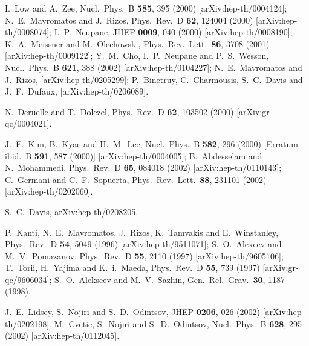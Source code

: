 \documentclass[a4paper,a4paper]{article}
\begin{document}
\begin{thebibliography}{99}
I.~Low and A.~Zee,
Nucl.\ Phys.\ B {\bf 585}, 395 (2000)
[arXiv:hep-th/0004124];
N.~E.~Mavromatos and J.~Rizos,
Phys.\ Rev.\ D {\bf 62}, 124004 (2000)
[arXiv:hep-th/0008074];
I.~P.~Neupane,
JHEP {\bf 0009}, 040 (2000)
[arXiv:hep-th/0008190];
K.~A.~Meissner and M.~Olechowski,
Phys.\ Rev.\ Lett.\  {\bf 86}, 3708 (2001)
[arXiv:hep-th/0009122];
Y.~M.~Cho, I.~P.~Neupane and P.~S.~Wesson,
Nucl.\ Phys.\ B {\bf 621}, 388 (2002)
[arXiv:hep-th/0104227];
N.~E.~Mavromatos and J.~Rizos,
[arXiv:hep-th/0205299];
P.~Binetruy, C.~Charmousis, S.~C.~Davis and J.~F.~Dufaux,
[arXiv:hep-th/0206089].


N.~Deruelle and T.~Dolezel,
Phys.\ Rev.\ D {\bf 62}, 103502 (2000)
[arXiv:gr-qc/0004021].


J.~E.~Kim, B.~Kyae and H.~M.~Lee,
Nucl.\ Phys.\ B {\bf 582}, 296 (2000)
[Erratum-ibid.\ B {\bf 591}, 587 (2000)]
[arXiv:hep-th/0004005];
B.~Abdesselam and N.~Mohammedi,
Phys.\ Rev.\ D {\bf 65}, 084018 (2002)
[arXiv:hep-th/0110143];
C.~Germani and C.~F.~Sopuerta,
Phys.\ Rev.\ Lett.\  {\bf 88}, 231101 (2002)
[arXiv:hep-th/0202060].



S.~C.~Davis,
arXiv:hep-th/0208205.



P.~Kanti, N.~E.~Mavromatos, J.~Rizos, K.~Tamvakis and E.~Winstanley,
Phys.\ Rev.\ D {\bf 54}, 5049 (1996)
[arXiv:hep-th/9511071];
S.~O.~Alexeev and M.~V.~Pomazanov,
Phys.\ Rev.\ D {\bf 55}, 2110 (1997)
[arXiv:hep-th/9605106];
T.~Torii, H.~Yajima and K.~i.~Maeda,
Phys.\ Rev.\ D {\bf 55}, 739 (1997)
[arXiv:gr-qc/9606034];
S.~O.~Alekseev and M.~V.~Sazhin,
Gen.\ Rel.\ Grav.\  {\bf 30}, 1187 (1998).


J.~E.~Lidsey, S.~Nojiri and S.~D.~Odintsov,
JHEP {\bf 0206}, 026 (2002)
[arXiv:hep-th/0202198].
M.~Cvetic, S.~Nojiri and S.~D.~Odintsov,
Nucl.\ Phys.\ B {\bf 628}, 295 (2002)
[arXiv:hep-th/0112045].



\end{thebibliography} 
\end{document}
